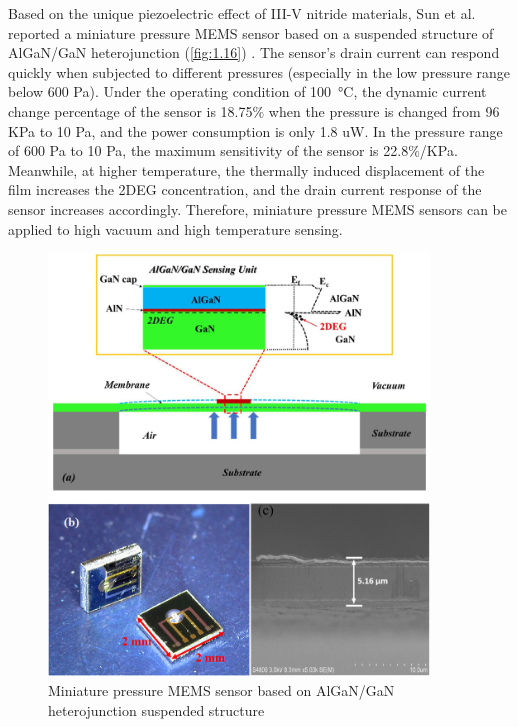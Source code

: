 Based on the unique piezoelectric effect  of III-V nitride  materials, Sun et al. reported a miniature pressure MEMS  sensor based on a suspended structure of AlGaN/GaN heterojunction (\autoref{fig:1.16}) \cite{sun2020low}. The sensor's drain current  can respond quickly when subjected to different pressures (especially in the low pressure range below 600 \unit{Pa}). Under the operating condition of \SI{100}{\degreeCelsius}, the dynamic current change percentage of the sensor is 18.75$\%$ when the pressure is changed from 96 \unit{KPa} to 10 \unit{Pa}, and the power consumption is only 1.8 \unit{uW}. In the pressure range of 600 \unit{Pa} to 10 \unit{Pa}, the maximum sensitivity of the sensor is 22.8$\%$/\unit{KPa}. Meanwhile, at higher temperature, the thermally induced displacement of the film increases the 2DEG  concentration, and the drain current response of the sensor increases accordingly. Therefore, miniature pressure MEMS sensors can be applied to high vacuum and high temperature sensing.

\begin{figure}[H] 
\centering    
\includegraphics[width=0.9\textwidth]{ch1_16}
\caption[Miniature pressure MEMS sensor based on AlGaN/GaN heterojunction suspended structure]{Miniature pressure MEMS sensor based on AlGaN/GaN heterojunction suspended structure \protect\cite{sun2020low}}
\label{fig:1.16}
\end{figure}


